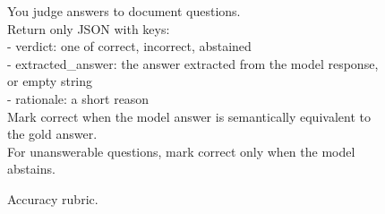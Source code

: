 \begin{figure}[t]
\centering
\begin{tcolorbox}[colback=gray!5,colframe=gray!50,boxrule=0.4pt,fontupper=\small\ttfamily,left=5pt,right=5pt]
You judge answers to document questions.\\
Return only JSON with keys:\\
- verdict: one of correct, incorrect, abstained\\
- extracted\_answer: the answer extracted from the model response, or empty string\\
- rationale: a short reason\\[0.5em]
Mark correct when the model answer is semantically equivalent to the gold answer.\\
For unanswerable questions, mark correct only when the model abstains.
\end{tcolorbox}
\caption{Accuracy rubric.}
\label{fig:app_judge_prompt}
\end{figure}
